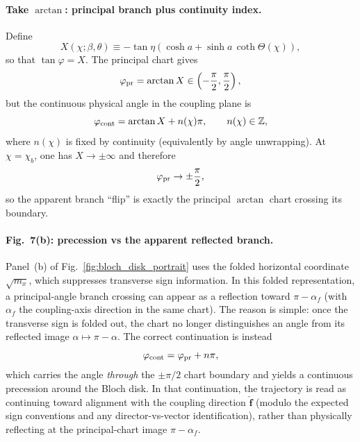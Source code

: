\paragraph{Take \texorpdfstring{$\arctan$}{arctan}: principal branch plus continuity index.}
Define
\begin{equation}
    X(\chi;\beta,\theta)
    \equiv
    -\tan\eta\left(\cosh a + \sinh a\,\coth\Theta(\chi)\right),
    \label{eq:branch_codex_X_def}
\end{equation}
so that $\tan\varphi = X$.  The principal chart gives
\begin{equation}
    \varphi_{\rm pr} = \arctan X \in \left(-\frac{\pi}{2},\frac{\pi}{2}\right),
\end{equation}
but the continuous physical angle in the coupling plane is
\begin{equation}
    \varphi_{\rm cont} = \arctan X + n(\chi)\pi,
    \qquad n(\chi)\in\mathbb{Z},
    \label{eq:branch_codex_varphi_cont_branch_index}
\end{equation}
where $n(\chi)$ is fixed by continuity (equivalently by angle unwrapping).
At $\chi=\chi_b$, one has $X\to\pm\infty$ and therefore
\begin{equation}
    \varphi_{\rm pr}\to \pm\frac{\pi}{2},
\end{equation}
so the apparent branch ``flip'' is exactly the principal $\arctan$ chart
crossing its boundary.

\paragraph{Fig.~7(b): precession vs the apparent reflected branch.}
Panel~(b) of Fig.~\ref{fig:bloch_disk_portrait} uses the folded horizontal
coordinate $\sqrt{m_x}$, which suppresses transverse sign information.  In this
folded representation, a principal-angle branch crossing can appear as a
reflection toward $\pi-\alpha_f$ (with $\alpha_f$ the coupling-axis direction
in the same chart).  The reason is simple: once the transverse sign is folded
out, the chart no longer distinguishes an angle from its reflected image
$\alpha\mapsto \pi-\alpha$.  The correct continuation is instead
\begin{equation}
    \varphi_{\rm cont} = \varphi_{\rm pr} + n\pi,
\end{equation}
which carries the angle \emph{through} the $\pm\pi/2$ chart boundary and yields
a continuous precession around the Bloch disk.  In that continuation, the
trajectory is read as continuing toward alignment with the coupling direction
$\hat{\mathbf f}$ (modulo the expected sign conventions and any
director-vs-vector identification), rather than physically reflecting at the
principal-chart image $\pi-\alpha_f$.

